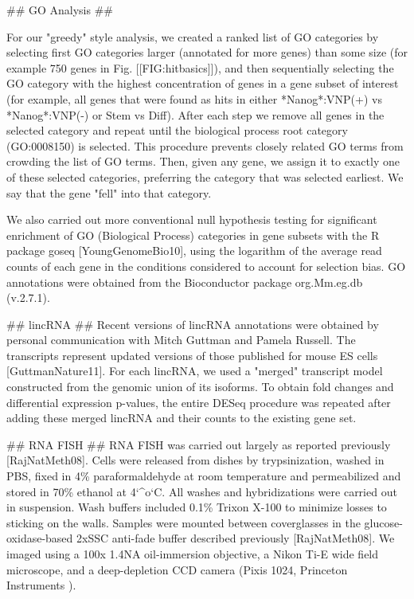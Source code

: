 \documentclass[aps,prl,twocolumn,superscriptaddress]{revtex4}
\newcommand{\degC}{`^o`C}
\begin{document}
## GO Analysis ##

For our "greedy" style analysis, we created a ranked list of GO categories by selecting first GO categories larger (annotated for more genes) than some size (for example 750 genes in Fig. [[FIG:hitbasics]]), and then sequentially selecting the GO category with the highest concentration of genes in a gene subset of interest (for example, all genes that were found as hits in either *Nanog*:VNP(+) vs *Nanog*:VNP(-) or Stem vs Diff). After each step we remove all genes in the selected category and repeat until the biological process root category (GO:0008150) is selected. This procedure prevents closely related GO terms from crowding the list of GO terms. Then, given any gene, we assign it to exactly one of these selected categories, preferring the category that was selected earliest. We say that the gene "fell" into that category.

  We also carried out more conventional null hypothesis testing for significant enrichment of GO (Biological Process) categories in gene subsets with the R package goseq [YoungGenomeBio10], using the logarithm of the average read counts of each gene in the conditions considered to account for selection bias. GO annotations were obtained from the Bioconductor package org.Mm.eg.db (v.2.7.1).

## lincRNA ##
Recent versions of lincRNA annotations were obtained by personal communication with Mitch Guttman and Pamela Russell. The transcripts represent updated versions of those published for mouse ES cells [GuttmanNature11]. For each lincRNA, we used a "merged" transcript model constructed from the genomic union of its isoforms. To obtain fold changes and differential expression p-values, the entire DESeq procedure was repeated after adding these merged lincRNA and their counts to the existing gene set. 

## RNA FISH ##
RNA FISH was carried out largely as reported previously [RajNatMeth08]. Cells were released from dishes by trypsinization, washed in PBS, fixed in 4\% paraformaldehyde at room temperature and permeabilized and stored in 70\% ethanol at 4\degC. All washes and hybridizations were carried out in suspension. Wash buffers included 0.1\% Trixon X-100 to minimize losses to sticking on the walls. Samples were mounted between coverglasses in the glucose-oxidase-based 2xSSC anti-fade buffer described previously [RajNatMeth08]. We imaged using a 100x 1.4NA oil-immersion objective, a Nikon Ti-E wide field microscope, and a deep-depletion CCD camera (Pixis 1024, Princeton Instruments ).
\end{document}
